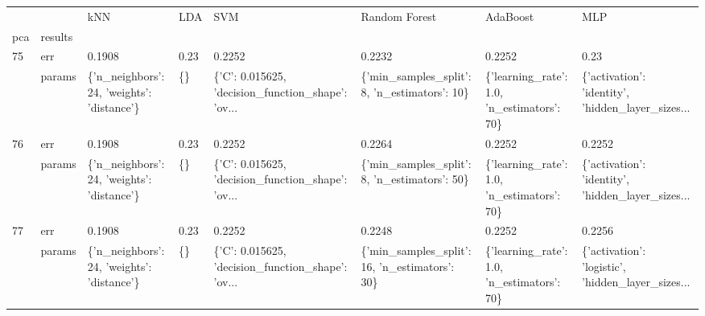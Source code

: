\begin{tabular}{llllllll}
\toprule
    &        &                                         kNN &     LDA &                                                SVM &                                  Random Forest &                                     AdaBoost &                                                MLP \\
pca & results &                                             &         &                                                    &                                                &                                              &                                                    \\
\midrule
75  & err &                                      0.1908 &    0.23 &                                             0.2252 &                                         0.2232 &                                       0.2252 &                                               0.23 \\
    & params &  \{'n\_neighbors': 24, 'weights': 'distance'\} &      \{\} &  \{'C': 0.015625, 'decision\_function\_shape': 'ov... &   \{'min\_samples\_split': 8, 'n\_estimators': 10\} &   \{'learning\_rate': 1.0, 'n\_estimators': 70\} &  \{'activation': 'identity', 'hidden\_layer\_sizes... \\
76  & err &                                      0.1908 &    0.23 &                                             0.2252 &                                         0.2264 &                                       0.2252 &                                             0.2252 \\
    & params &  \{'n\_neighbors': 24, 'weights': 'distance'\} &      \{\} &  \{'C': 0.015625, 'decision\_function\_shape': 'ov... &   \{'min\_samples\_split': 8, 'n\_estimators': 50\} &   \{'learning\_rate': 1.0, 'n\_estimators': 70\} &  \{'activation': 'identity', 'hidden\_layer\_sizes... \\
77  & err &                                      0.1908 &    0.23 &                                             0.2252 &                                         0.2248 &                                       0.2252 &                                             0.2256 \\
    & params &  \{'n\_neighbors': 24, 'weights': 'distance'\} &      \{\} &  \{'C': 0.015625, 'decision\_function\_shape': 'ov... &  \{'min\_samples\_split': 16, 'n\_estimators': 30\} &   \{'learning\_rate': 1.0, 'n\_estimators': 70\} &  \{'activation': 'logistic', 'hidden\_layer\_sizes... \\

\end{tabular}
